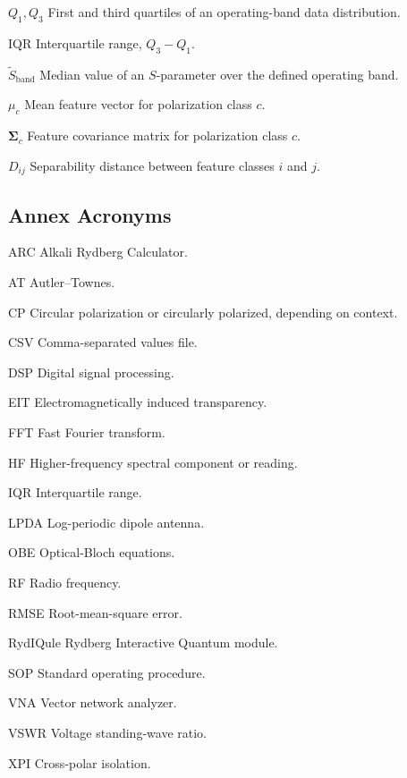 \documentclass{ieeeaccess}
\begin{document}
\begin{IEEEdescription}
\item[$Q_1,Q_3$] First and third quartiles of an operating-band data distribution.
\item[$\mathrm{IQR}$] Interquartile range, \(Q_3-Q_1\).
\item[$\widetilde{S}_{\mathrm{band}}$] Median value of an \(S\)-parameter over the defined operating band.
\item[$\mu_c$] Mean feature vector for polarization class \(c\).
\item[$\mathbf{\Sigma}_c$] Feature covariance matrix for polarization class \(c\).
\item[$D_{ij}$] Separability distance between feature classes \(i\) and \(j\).

\end{IEEEdescription}

\subsection{Annex Acronyms}

\begin{IEEEdescription}

\item[ARC] Alkali Rydberg Calculator.
\item[AT] Autler--Townes.
\item[CP] Circular polarization or circularly polarized, depending on context.
\item[CSV] Comma-separated values file.
\item[DSP] Digital signal processing.
\item[EIT] Electromagnetically induced transparency.
\item[FFT] Fast Fourier transform.
\item[HF] Higher-frequency spectral component or reading.
\item[IQR] Interquartile range.
\item[LPDA] Log-periodic dipole antenna.
\item[OBE] Optical-Bloch equations.
\item[RF] Radio frequency.
\item[RMSE] Root-mean-square error.
\item[RydIQule] Rydberg Interactive Quantum module.
\item[SOP] Standard operating procedure.
\item[VNA] Vector network analyzer.
\item[VSWR] Voltage standing-wave ratio.
\item[XPI] Cross-polar isolation.

\end{IEEEdescription}
\end{document}
